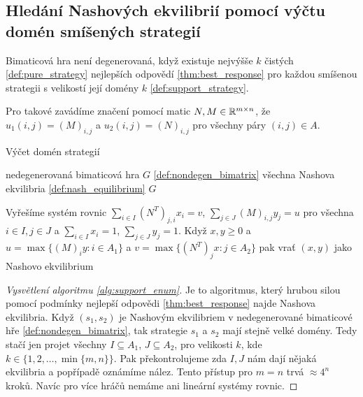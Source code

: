 \subsection{Hledání Nashových ekvilibrií pomocí výčtu domén smíšených strategií}
\begin{definition}
\label{def:nondegen_bimatrix}
Bimaticová hra není degenerovaná, když existuje nejvýšše $k$ čistých \ref{def:pure_strategy} nejlepších odpovědí \ref{thm:best_response} pro každou smíšenou strategii s velikostí její domény $k$ \ref{def:support_strategy}.

Pro takové zavádíme značení pomocí matic $N,M \in \mathbb{R}^{m\times n}$, že $u_1(i,j) = (M)_{i,j}$ a $u_2(i,j) = (N)_{i,j}$ pro všechny páry $(i,j) \in A$.
\end{definition}
\begin{algorithm}
    \algrenewcommand{}
    \algrenewcommand{}
    \caption{Výčet domén strategií}
    \label{alg:support_enum}
    \begin{algorithmic}[1]
        \Require  nedegenerovaná bimaticová hra $G$ \ref{def:nondegen_bimatrix}
        \Ensure  všechna Nashova ekvilibria \ref{def:nash_equilibrium} $G$
        
            \State Vyřešíme systém rovnic $\sum_{i\in I} (N^T)_{j,i} x_i = v$, $\sum_{j\in J} (M)_{i,j} y_j = u$ pro všechna $i\in I, j\in J$ a $\sum_{i \in I} x_i = 1$, $\sum_{j \in J} y_j = 1$.
            \State Když $x,y\geq 0$ a $u = \max\{(M)_{i}y: i \in A_1\}$ a $v = \max\{(N^T)_{j}x: j \in A_2\}$ pak vrať $(x,y)$ jako Nashovo ekvilibrium
        \EndFor
    \end{algorithmic}
\end{algorithm}

\begin{proof}[Vysvětlení algoritmu \ref{alg:support_enum}]
    Je to algoritmus, který hrubou silou pomocí podmínky nejlepší odpovědi \ref{thm:best_response} najde Nashova ekvilibria. 
Když $(s_1,s_2)$ je Nashovým ekvilibriem v nedegenerované bimaticové hře \ref{def:nondegen_bimatrix}, tak strategie $s_1$ a $s_2$ mají stejně velké domény. 
Tedy stačí jen projet všechny $I\subseteq A_1$, $J \subseteq A_2$, pro velikosti $k$, kde $k \in \{1,2,\dots, \min\{m,n\}\}$. 
Pak překontrolujeme zda $I,J$ nám dají nějaká ekvilibria a popřípadě oznámíme nález. 
Tento přístup pro $m = n$ trvá $\approx 4^n$ kroků. 
Navíc pro více hráčů nemáme ani lineární systémy rovnic. 
\end{proof}


